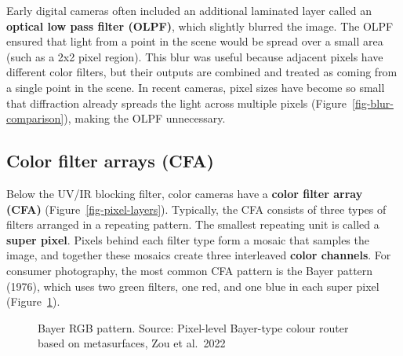 \documentclass[
  letterpaper,
]{book}
\begin{document}
Early digital cameras often included an additional laminated layer
called an \textbf{optical low pass filter (OLPF)}, which slightly
blurred the image. The OLPF ensured that light from a point in the scene
would be spread over a small area (such as a 2x2 pixel region). This
blur was useful because adjacent pixels have different color filters,
but their outputs are combined and treated as coming from a single point
in the scene. In recent cameras, pixel sizes have become so small that
diffraction already spreads the light across multiple pixels
(Figure~\ref{fig-blur-comparison}), making the OLPF unnecessary.

\subsection{Color filter arrays (CFA)}\label{sec-sensor-cfa}

Below the UV/IR blocking filter, color cameras have a \textbf{color
filter array (CFA)} (Figure~\ref{fig-pixel-layers}). Typically, the CFA
consists of three types of filters arranged in a repeating pattern. The
smallest repeating unit is called a \textbf{super pixel}. Pixels behind
each filter type form a mosaic that samples the image, and together
these mosaics create three interleaved \textbf{color channels}. For
consumer photography, the most common CFA pattern is the Bayer pattern
(1976), which uses two green filters, one red, and one blue in each
super pixel (Figure~\ref{fig-cfa-pattern}).

\begin{figure}


\caption{\label{fig-cfa-pattern}Bayer RGB pattern. Source: Pixel-level
Bayer-type colour router based on metasurfaces, Zou et al.~2022}

\end{figure}%
\end{document}
